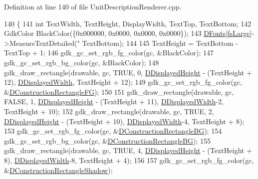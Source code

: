Definition at line 140 of file Unit\+Description\+Renderer.\+cpp.


\begin{DoxyCode}
140                                                                                              \{
141     \textcolor{keywordtype}{int} TextWidth, TextHeight, DisplayWidth, TextTop, TextBottom;
142     GdkColor BlackColor(\{0x000000, 0x0000, 0x0000, 0x0000\});
143     \hyperlink{classCUnitDescriptionRenderer_a270a545ecdb1602cd2a0a2def8997dc8}{DFonts}[\hyperlink{classCUnitDescriptionRenderer_a3ea4cd83b6dd9533ab3abb953a7da35aaf467097fe4f4811a5e2f1959c86e071d}{fsLarge}]->MeasureTextDetailed(\textcolor{stringliteral}{"%
      TextBottom);
144     
145     TextHeight = TextBottom - TextTop + 1;
146     gdk\_gc\_set\_rgb\_fg\_color(gc, &BlackColor);
147     gdk\_gc\_set\_rgb\_bg\_color(gc, &BlackColor);
148     gdk\_draw\_rectangle(drawable, gc, TRUE, 0, \hyperlink{classCUnitDescriptionRenderer_acc5f08d377a050f778614561a0b12a6c}{DDisplayedHeight} - (TextHeight + 12),  
      \hyperlink{classCUnitDescriptionRenderer_a4c472ecc82b5956fc65aeebb2faf17fd}{DDisplayedWidth}, TextHeight + 12);
149     gdk\_gc\_set\_rgb\_fg\_color(gc, &\hyperlink{classCUnitDescriptionRenderer_a2f4f541a008668f1b8fc55500443c1a3}{DConstructionRectangleFG});
150     
151     gdk\_draw\_rectangle(drawable, gc, FALSE, 1, \hyperlink{classCUnitDescriptionRenderer_acc5f08d377a050f778614561a0b12a6c}{DDisplayedHeight} - (TextHeight + 11),  
      \hyperlink{classCUnitDescriptionRenderer_a4c472ecc82b5956fc65aeebb2faf17fd}{DDisplayedWidth}-2, TextHeight + 10);
152     gdk\_draw\_rectangle(drawable, gc, TRUE, 2, \hyperlink{classCUnitDescriptionRenderer_acc5f08d377a050f778614561a0b12a6c}{DDisplayedHeight} - (TextHeight + 10),  
      \hyperlink{classCUnitDescriptionRenderer_a4c472ecc82b5956fc65aeebb2faf17fd}{DDisplayedWidth}-4, TextHeight + 8);
153     gdk\_gc\_set\_rgb\_fg\_color(gc, &\hyperlink{classCUnitDescriptionRenderer_a7a763ac1aec2ee9d3b70694e1fbe4f9d}{DConstructionRectangleBG});
154     gdk\_gc\_set\_rgb\_bg\_color(gc, &\hyperlink{classCUnitDescriptionRenderer_a7a763ac1aec2ee9d3b70694e1fbe4f9d}{DConstructionRectangleBG});
155     gdk\_draw\_rectangle(drawable, gc, TRUE, 4, \hyperlink{classCUnitDescriptionRenderer_acc5f08d377a050f778614561a0b12a6c}{DDisplayedHeight} - (TextHeight + 8),  
      \hyperlink{classCUnitDescriptionRenderer_a4c472ecc82b5956fc65aeebb2faf17fd}{DDisplayedWidth}-8, TextHeight + 4);
156     
157     gdk\_gc\_set\_rgb\_fg\_color(gc, &\hyperlink{classCUnitDescriptionRenderer_a8e19ce3520d89f775dc5de84c2985221}{DConstructionRectangleShadow});
}
\end{DoxyCode}
